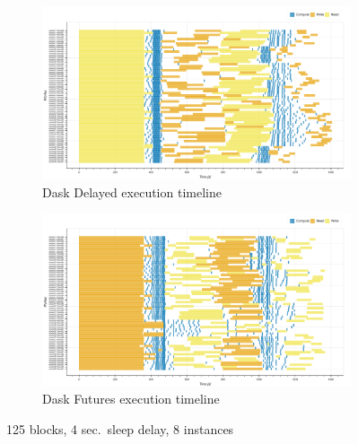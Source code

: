 \documentclass[conference]{IEEEtran}
\begin{document}
\begin{figure}[!htb]
\begin{subfigure}[b]{\columnwidth}
    \end{subfigure}
    \\
    \begin{subfigure}[b]{\columnwidth}
        \includegraphics[clip,width=\columnwidth]{images/Dask_delayed_inc_baseline_gantt.png}%
        \caption{Dask Delayed execution timeline}\label{fig:inc_dask_delayed_gantt}
    \end{subfigure}
    \hfill
    \begin{subfigure}[b]{\columnwidth}
        \includegraphics[clip,width=\columnwidth]{images/Dask_futures_inc_baseline_gantt.png}%
        \caption{Dask Futures execution timeline}\label{fig:inc_dask_futures_gantt}
    \end{subfigure}
    \caption{125 blocks, 4 sec.\ sleep delay, 8 instances}\label{fig:inc_gantt}
\end{figure}
\end{document}
